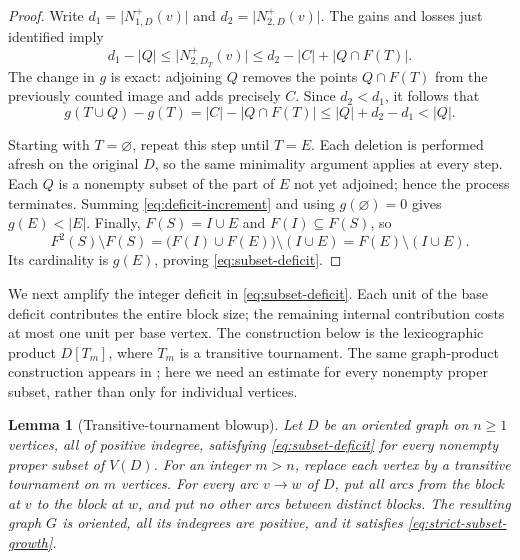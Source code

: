 \documentclass[11pt]{article}
\newtheorem{lemma}[theorem]{Lemma}
\theoremstyle{remark}
\newcommand{\abs}[1]{\lvert #1\rvert}
\begin{document}
\begin{proof}
Write $d_1=\abs{N_{1,D}^+(v)}$ and
$d_2=\abs{N_{2,D}^+(v)}$.  The gains and losses just identified imply
\[
  d_1-\abs{Q}
  \le \abs{N_{2,D_T}^+(v)}
  \le d_2-\abs{C}+\abs{Q\cap F(T)}.
\]
The change in $g$ is exact: adjoining $Q$ removes the points
$Q\cap F(T)$ from the previously counted image and adds precisely $C$.
Since $d_2<d_1$, it follows that
\begin{equation}
\label{eq:deficit-increment}
  g(T\cup Q)-g(T)
  =\abs{C}-\abs{Q\cap F(T)}
  \le \abs{Q}+d_2-d_1
  <\abs{Q}.
\end{equation}

Starting with $T=\varnothing$, repeat this step until $T=E$.
Each deletion is performed afresh on the original $D$, so the same
minimality argument applies at every step.  Each $Q$ is a nonempty
subset of the part of $E$ not yet adjoined; hence the process terminates.
Summing \eqref{eq:deficit-increment} and using $g(\varnothing)=0$
gives $g(E)<\abs{E}$.  Finally,
$F(S)=I\cup E$ and $F(I)\subseteq F(S)$, so
\[
  F^2(S)\setminus F(S)
  =\bigl(F(I)\cup F(E)\bigr)\setminus(I\cup E)
  =F(E)\setminus(I\cup E).
\]
Its cardinality is $g(E)$, proving \eqref{eq:subset-deficit}.
\end{proof}

We next amplify the integer deficit in \eqref{eq:subset-deficit}.
Each unit of the base deficit contributes the entire block size; the
remaining internal contribution costs at most one unit per base vertex.
The construction below is the lexicographic product $D[T_m]$, where $T_m$
is a transitive tournament.  The same graph-product construction appears
in \cite[Theorem~4.3]{BrantnerBrockmanKaySnively2009}; here we need an
estimate for every nonempty proper subset, rather than only for individual
vertices.

\begin{lemma}[Transitive-tournament blowup]
\label{lem:blowup}
Let $D$ be an oriented graph on $n\ge1$ vertices, all of positive
indegree, satisfying \eqref{eq:subset-deficit} for every nonempty proper
subset of $V(D)$.  For an integer $m>n$, replace each vertex by a
transitive tournament on $m$ vertices.  For every arc $v\to w$ of $D$,
put all arcs from the block at $v$ to the block at $w$, and put no other
arcs between distinct blocks.  The resulting graph $G$ is oriented,
all its indegrees are positive, and it satisfies
\eqref{eq:strict-subset-growth}.
\end{lemma}
\end{document}
